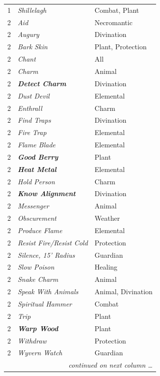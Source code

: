 \begin{multicols}{2}
\begin{minipage}{\columnwidth}
\begin{tabular}{|p{}|p{}|p{}|}
1	& \textit{Shillelagh}	& Combat, Plant \\
\rowcolor[gray]{.9}2	& \textit{Aid}	& Necromantic \\
2	& \textit{Augury}	& Divination \\
\rowcolor[gray]{.9}2	& \textit{Bark Skin}	& Plant, Protection \\
2	& \textit{Chant}	& All \\
\rowcolor[gray]{.9}2	& \textit{Charm}	& Animal \\
2	& \textbf{\textit{Detect Charm}}	& Divination \\
\rowcolor[gray]{.9}2	& \textit{Dust Devil}	& Elemental \\
2	& \textit{Enthrall}	& Charm \\
\rowcolor[gray]{.9}2	& \textit{Find Traps}	& Divination \\
2	& \textit{Fire Trap}	& Elemental \\
\rowcolor[gray]{.9}2	& \textit{Flame Blade}	& Elemental \\
2	& \textbf{\textit{Good Berry}}	& Plant \\
\rowcolor[gray]{.9}2	& \textbf{\textit{Heat Metal}}	& Elemental \\
2	& \textit{Hold Person}	& Charm \\
\rowcolor[gray]{.9}2	& \textbf{\textit{Know Alignment}}	& Divination \\
2	& \textit{Messenger}	& Animal \\
\rowcolor[gray]{.9}2	& \textit{Obscurement}	& Weather \\
2	& \textit{Produce Flame}	& Elemental \\
\rowcolor[gray]{.9}2	& \textit{Resist Fire/Resist Cold}	& Protection \\
2	& \textit{Silence, 15' Radius}	& Guardian \\
\rowcolor[gray]{.9}2	& \textit{Slow Poison}	& Healing \\
2	& \textit{Snake Charm}	& Animal \\
\rowcolor[gray]{.9}2	& \textit{Speak With Animals}	& Animal, Divination \\
2	& \textit{Spiritual Hammer}	& Combat \\
\rowcolor[gray]{.9}2	& \textit{Trip}	& Plant \\
2	& \textbf{\textit{Warp Wood}}	& Plant \\
\rowcolor[gray]{.9}2	& \textit{Withdraw}	& Protection \\
2	& \textit{Wyvern Watch}	& Guardian \\
\hline
\multicolumn{3}{r}{\textit{continued on next column \ldots}} \\
\end{tabular}


\end{minipage}
\end{multicols}
